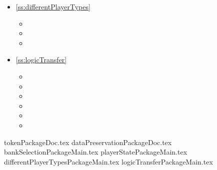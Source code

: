 \begin{multicols}{2}
\begin{itemize}
\begin{minipage}{\linewidth}
\begin{itemize}
	\end{itemize}
	\end{minipage}
	\item \ref{ss:differentPlayerTypes} 
	\begin{itemize}
		\item {}
		\item {}
		\item {}
	\end{itemize}
	\item \ref{ss:logicTransfer} 
	\begin{itemize}
		\item {}
		\item {}
		\item {}		
		\item {}
		\item {}		
		\item {}
	\end{itemize}
\end{itemize}
\end{multicols}


{tokenPackageDoc.tex}
\newpage
{dataPreservationPackageDoc.tex}
\newpage
{bankSelectionPackageMain.tex}
\newpage
{playerStatePackageMain.tex}
\newpage
{differentPlayerTypesPackageMain.tex}
\newpage
{logicTransferPackageMain.tex}
